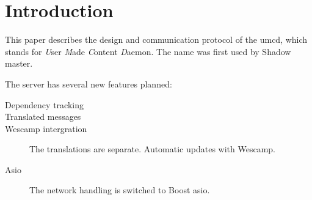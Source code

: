 \chapter{Introduction}
\label{chapter:introduction}

This paper describes the design and communication protocol of the umcd,
which stands for \emph{U}ser \emph{M}ade \emph{C}ontent \emph{D}aemon. The
name was first used by Shadow master.

The server has several new features planned:
\begin{description}
\item[Dependency tracking]
	

\item[Translated messages]

\item[Wescamp intergration]
	The translations are separate. Automatic updates with Wescamp. 

\item[Asio]
	The network handling is switched to Boost asio.

\end{description}
